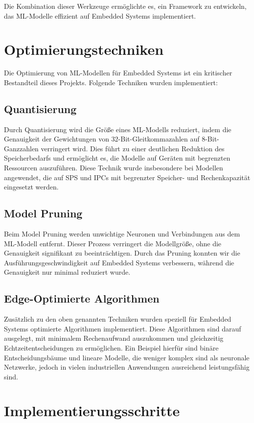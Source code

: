 Die Kombination dieser Werkzeuge ermöglichte es, ein Framework zu entwickeln, das ML-Modelle effizient auf Embedded Systems implementiert.

\section{Optimierungstechniken}

Die Optimierung von ML-Modellen für Embedded Systems ist ein kritischer Bestandteil dieses Projekts. Folgende Techniken wurden implementiert:

\subsection{Quantisierung}
Durch Quantisierung wird die Größe eines ML-Modells reduziert, indem die Genauigkeit der Gewichtungen von 32-Bit-Gleitkommazahlen auf 8-Bit-Ganzzahlen verringert wird. 
Dies führt zu einer deutlichen Reduktion des Speicherbedarfs und ermöglicht es, die Modelle auf Geräten mit begrenzten Ressourcen auszuführen. 
Diese Technik wurde insbesondere bei Modellen angewendet, die auf SPS und IPCs mit begrenzter Speicher- und Rechenkapazität eingesetzt werden.

\subsection{Model Pruning}
Beim Model Pruning werden unwichtige Neuronen und Verbindungen aus dem ML-Modell entfernt. Dieser Prozess verringert die Modellgröße, ohne die Genauigkeit signifikant 
zu beeinträchtigen. Durch das Pruning konnten wir die Ausführungsgeschwindigkeit auf Embedded Systems verbessern, während die Genauigkeit nur minimal reduziert wurde.

\subsection{Edge-Optimierte Algorithmen}
Zusätzlich zu den oben genannten Techniken wurden speziell für Embedded Systems optimierte Algorithmen implementiert. Diese Algorithmen sind darauf ausgelegt, 
mit minimalem Rechenaufwand auszukommen und gleichzeitig Echtzeitentscheidungen zu ermöglichen. Ein Beispiel hierfür sind binäre Entscheidungsbäume und lineare Modelle, 
die weniger komplex sind als neuronale Netzwerke, jedoch in vielen industriellen Anwendungen ausreichend leistungsfähig sind.

\section{Implementierungsschritte}

